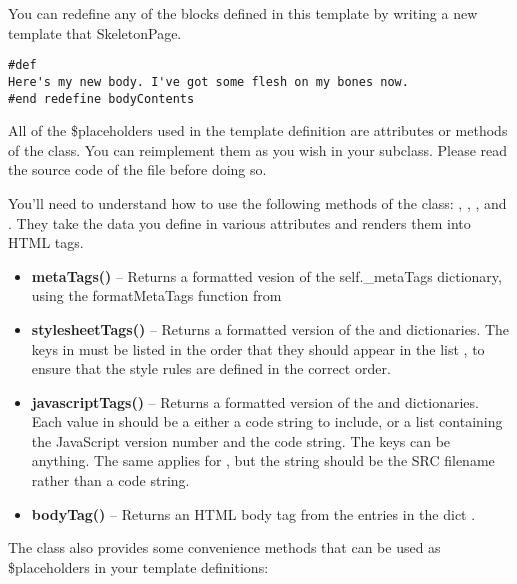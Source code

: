 You can redefine any of the blocks defined in this template by writing a new
template that  SkeletonPage.  

\begin{verbatim}
#def 
Here's my new body. I've got some flesh on my bones now.
#end redefine bodyContents
\end{verbatim}

All of the \$placeholders used in the  template definition
are attributes or methods of the  class.  You can reimplement
them as you wish in your subclass.  Please read the source code of the file
 before doing so.  

You'll need to understand how to use the following methods of the
 class: , ,
, and .  They take the data you
define in various attributes and renders them into HTML tags.

\begin{itemize}
\item {\bf metaTags()} -- Returns a formatted vesion of the self._metaTags
     dictionary, using the formatMetaTags function from 
\item {\bf stylesheetTags()} -- Returns a formatted version of the
      and  dictionaries.  The
     keys in  must be listed in the order that they
     should appear in the list , to ensure that the
     style rules are defined in the correct order.
\item {\bf javascriptTags()} -- Returns a formatted version of the
      and  dictionaries.
     Each value in  should be a either a code string
     to include, or a list containing the JavaScript version number and the code
     string. The keys can be anything.  The same applies for
     , but the string should be the SRC filename
     rather than a code string.
\item {\bf bodyTag()} -- Returns an HTML body tag from the entries in the dict
     .
\end{itemize}

The class also provides some convenience methods that can be used as
\$placeholders in your template definitions:

